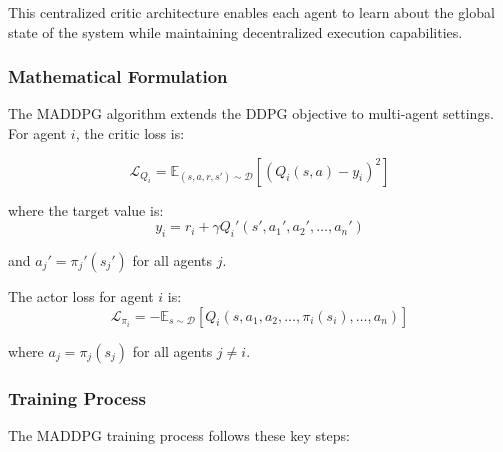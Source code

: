 \documentclass[conference]{IEEEtran}
\begin{document}
{{This centralized critic architecture enables each agent to learn about the global state of the system while maintaining decentralized execution capabilities.

\subsubsection{Mathematical Formulation}

The MADDPG algorithm extends the DDPG objective to multi-agent settings. For agent $i$, the critic loss is:

\begin{equation}
\mathcal{L}_{Q_i} = \mathbb{E}_{(s, a, r, s') \sim \mathcal{D}} \left[ \left( Q_i(s, a) - y_i \right)^2 \right]
\end{equation}

where the target value is:
\begin{equation}
y_i = r_i + \gamma Q_i'(s', a_1', a_2', \ldots, a_n')
\end{equation}

and $a_j' = \pi_j'(s_j')$ for all agents $j$.

The actor loss for agent $i$ is:
\begin{equation}
\mathcal{L}_{\pi_i} = -\mathbb{E}_{s \sim \mathcal{D}} \left[ Q_i(s, a_1, a_2, \ldots, \pi_i(s_i), \ldots, a_n) \right]
\end{equation}

where $a_j = \pi_j(s_j)$ for all agents $j \neq i$.

\subsubsection{Training Process}

The MADDPG training process follows these key steps:

}}
\end{document}
